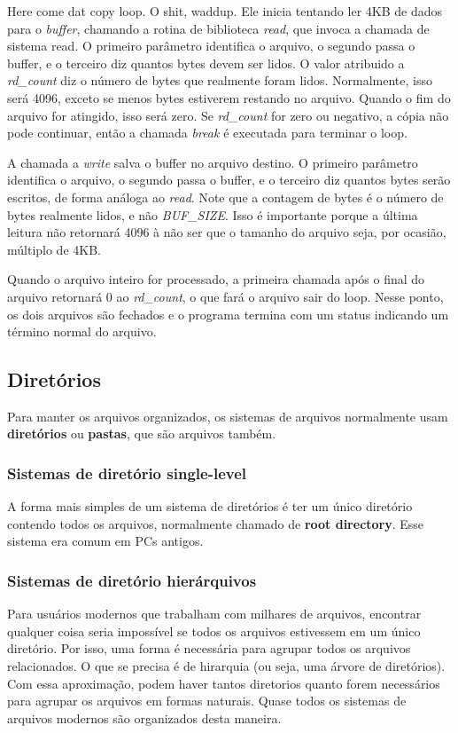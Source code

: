 \documentclass[10pt]{article}
\begin{document}
 Here come dat copy loop. O shit, waddup. Ele inicia tentando ler 4KB de dados
 para o \textit{buffer}, chamando a rotina de biblioteca \textit{read}, que invoca
 a chamada de sistema read. O primeiro parâmetro identifica o arquivo, o segundo passa
 o buffer, e o terceiro diz quantos bytes devem ser lidos. O valor atribuido a
 \textit{rd\_count} diz o número de bytes que realmente foram lidos. Normalmente, isso
 será 4096, exceto se menos bytes estiverem restando no arquivo. Quando o fim do arquivo for
 atingido, isso será zero. Se \textit{rd\_count} for zero ou negativo, a cópia não pode continuar,
 então a chamada \textit{break} é executada para terminar o loop.

 A chamada a \textit{write} salva o buffer no arquivo destino. O primeiro parâmetro identifica 
 o arquivo, o segundo passa o buffer, e o terceiro diz quantos bytes serão escritos, de forma
 análoga ao \textit{read}. Note que a contagem de bytes é o número de bytes realmente lidos, e
 não \textit{BUF\_SIZE}. Isso é importante porque a última leitura não retornará 4096 à não ser
 que o tamanho do arquivo seja, por ocasião, múltiplo de 4KB.

 Quando o arquivo inteiro for processado, a primeira chamada após o final do arquivo retornará
 0 ao \textit{rd\_count}, o que fará o arquivo sair do loop. Nesse ponto, os dois arquivos são fechados
 e o programa termina com um status indicando um término normal do arquivo. 

 \subsection{Diretórios}

 Para manter os arquivos organizados, os sistemas de arquivos normalmente usam \textbf{diretórios}
 ou \textbf{pastas}, que são arquivos também. 

 \subsubsection{Sistemas de diretório single-level}
 A forma mais simples de um sistema de diretórios é ter um único diretório contendo todos os
 arquivos, normalmente chamado de \textbf{root directory}. Esse sistema era comum em PCs antigos.

 \subsubsection{Sistemas de diretório hierárquivos}
 Para usuários modernos que trabalham com milhares de arquivos, encontrar qualquer coisa seria
 impossível se todos os arquivos estivessem em um único diretório. Por isso, uma forma é necessária
 para agrupar todos os arquivos relacionados. O que se precisa é de hirarquia (ou seja, uma árvore
 de diretórios). Com essa aproximação, podem haver tantos diretorios quanto forem necessários para
 agrupar os arquivos em formas naturais. Quase todos os sistemas de arquivos modernos são organizados
 desta maneira.
\end{document}
